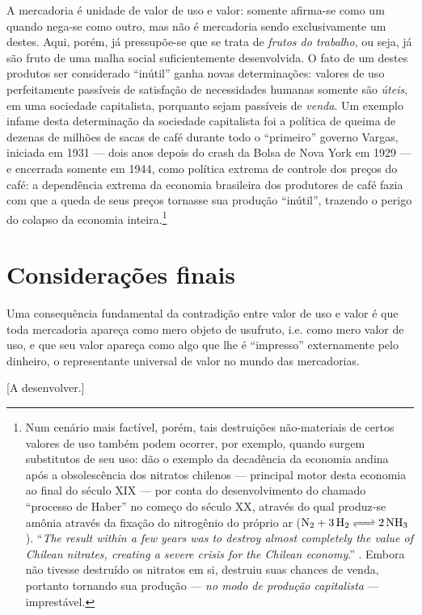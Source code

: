 \documentclass[12pt]{article}
\begin{document}
A mercadoria é unidade de valor de uso e valor: somente afirma-se como um quando nega-se como outro, mas não é mercadoria sendo exclusivamente um destes. Aqui, porém, já pressupõe-se que se trata de \textit{frutos do trabalho}, ou seja, já são fruto de uma malha social suficientemente desenvolvida. O fato de um destes produtos ser considerado ``inútil'' ganha novas determinações: valores de uso perfeitamente passíveis de satisfação de necessidades humanas somente são \textit{úteis}, em uma sociedade capitalista, porquanto sejam passíveis de \textit{venda}. Um exemplo infame desta determinação da sociedade capitalista foi a política de queima de dezenas de milhões de sacas de café durante todo o ``primeiro'' governo Vargas, iniciada em 1931 — dois anos depois do crash da Bolsa de Nova York em 1929 — e encerrada somente em 1944, como política extrema de controle dos preços do café: a dependência extrema da economia brasileira dos produtores de café fazia com que a queda de seus preços tornasse sua produção ``inútil'', trazendo o perigo do colapso da economia inteira.\footnote{Num cenário mais factível, porém, tais destruições não-materiais de certos valores de uso também podem ocorrer, por exemplo, quando surgem substitutos de seu uso: \textcite{Foster2004} dão o exemplo da decadência da economia andina após a obsolescência dos nitratos chilenos — principal motor desta economia ao final do século XIX — por conta do desenvolvimento do chamado ``processo de Haber'' no começo do século XX, através do qual produz-se amônia através da fixação do nitrogênio do próprio ar ($\ce{ N_{2} + 3H_{2} <=> 2 NH_{3}}$). ``\textit{The result within a few years was to destroy almost completely the value of Chilean nitrates, creating a severe crisis for the Chilean economy}.'' \parencite[p. 192]{Foster2004}. Embora não tivesse destruído os nitratos em si, destruiu suas chances de venda, portanto tornando sua produção — \textit{no modo de produção capitalista} — imprestável. }

\section{Considerações finais}
Uma consequência fundamental da contradição entre valor de uso e valor é que toda mercadoria apareça como mero objeto de usufruto, i.e. como mero valor de uso, e que seu valor apareça como algo que lhe é ``impresso'' externamente pelo dinheiro, o representante universal de valor no mundo das mercadorias.

[A desenvolver.]



\printbibliography
\end{document}
